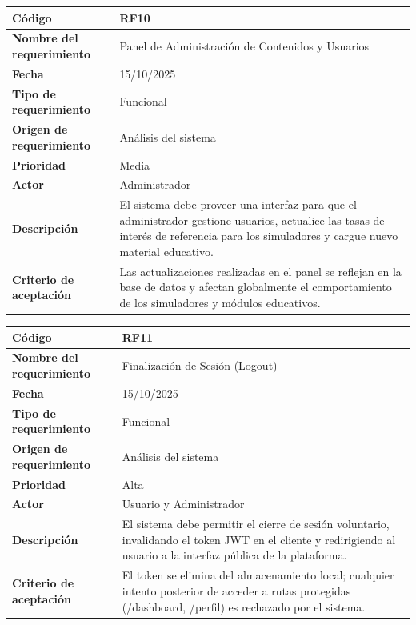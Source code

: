 \begin{table}[H]
	\begin{tabular}{|a{5cm}|m{11cm}|}
		\hline
		\textbf{Código} & RF10 \\ \hline
		\textbf{Nombre del requerimiento} & Panel de Administración de Contenidos y Usuarios \\ \hline
		\textbf{Fecha} & 15/10/2025 \\ \hline
		\textbf{Tipo de requerimiento} & Funcional \\ \hline
		\textbf{Origen de requerimiento} & Análisis del sistema \\ \hline
		\textbf{Prioridad} & Media \\ \hline
		\textbf{Actor} & Administrador \\ \hline
		\textbf{Descripción} & El sistema debe proveer una interfaz para que el administrador gestione usuarios, actualice las tasas de interés de referencia para los simuladores y cargue nuevo material educativo. \\ \hline
		\textbf{Criterio de aceptación} & Las actualizaciones realizadas en el panel se reflejan en la base de datos y afectan globalmente el comportamiento de los simuladores y módulos educativos. \\ \hline
	\end{tabular}
\end{table}

\begin{table}[H]
	\begin{tabular}{|a{5cm}|m{11cm}|}
		\hline
		\textbf{Código} & RF11 \\ \hline
		\textbf{Nombre del requerimiento} & Finalización de Sesión (Logout) \\ \hline
		\textbf{Fecha} & 15/10/2025 \\ \hline
		\textbf{Tipo de requerimiento} & Funcional \\ \hline
		\textbf{Origen de requerimiento} & Análisis del sistema \\ \hline
		\textbf{Prioridad} & Alta \\ \hline
		\textbf{Actor} & Usuario y Administrador \\ \hline
		\textbf{Descripción} & El sistema debe permitir el cierre de sesión voluntario, invalidando el token JWT en el cliente y redirigiendo al usuario a la interfaz pública de la plataforma. \\ \hline
		\textbf{Criterio de aceptación} & El token se elimina del almacenamiento local; cualquier intento posterior de acceder a rutas protegidas (/dashboard, /perfil) es rechazado por el sistema. \\ \hline
	\end{tabular}
\end{table}


